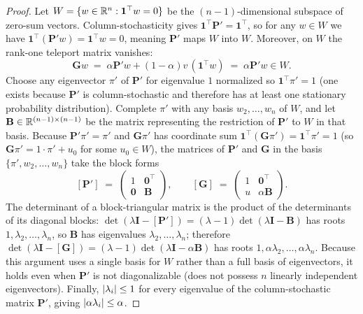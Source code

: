 \begin{proof}
Let $W=\{w \in \mathbb{R}^n : \mathbf{1}^\top w=0\}$ be the $(n-1)$-dimensional subspace of zero-sum vectors. Column-stochasticity gives $\mathbf{1}^\top\mathbf{P}'=\mathbf{1}^\top$, so for any $w \in W$ we have $\mathbf{1}^\top(\mathbf{P}'w) = \mathbf{1}^\top w = 0$, meaning $\mathbf{P}'$ maps $W$ into $W$. Moreover, on $W$ the rank-one teleport matrix vanishes:
\[
  \mathbf{G}w \;=\; \alpha\mathbf{P}'w + (1-\alpha)v\,(\mathbf{1}^\top w) \;=\; \alpha\mathbf{P}'w \in W.
\]
Choose any eigenvector $\pi'$ of $\mathbf{P}'$ for eigenvalue $1$ normalized so $\mathbf{1}^\top \pi' = 1$ (one exists because $\mathbf{P}'$ is column-stochastic and therefore has at least one stationary probability distribution). Complete $\pi'$ with any basis $w_2,\dots,w_n$ of $W$, and let $\mathbf{B} \in \mathbb{R}^{(n-1)\times(n-1)}$ be the matrix representing the restriction of $\mathbf{P}'$ to $W$ in that basis. Because $\mathbf{P}'\pi' = \pi'$ and $\mathbf{G}\pi'$ has coordinate sum $\mathbf{1}^\top(\mathbf{G}\pi') = \mathbf{1}^\top \pi' = 1$ (so $\mathbf{G}\pi' = 1\cdot\pi' + u_0$ for some $u_0 \in W$), the matrices of $\mathbf{P}'$ and $\mathbf{G}$ in the basis $\{\pi', w_2, \dots, w_n\}$ take the block forms
\[
  [\mathbf{P}'] \;=\;
  \begin{pmatrix}
    1 & \mathbf{0}^\top \\
    \mathbf{0} & \mathbf{B}
  \end{pmatrix},
  \qquad
  [\mathbf{G}] \;=\;
  \begin{pmatrix}
    1 & \mathbf{0}^\top \\
    u & \alpha\mathbf{B}
  \end{pmatrix}.
\]
The determinant of a block-triangular matrix is the product of the determinants of its diagonal blocks: $\det(\lambda\mathbf{I} - [\mathbf{P}']) = (\lambda - 1)\det(\lambda\mathbf{I} - \mathbf{B})$ has roots $1, \lambda_2, \dots, \lambda_n$, so $\mathbf{B}$ has eigenvalues $\lambda_2,\dots,\lambda_n$; therefore $\det(\lambda\mathbf{I} - [\mathbf{G}]) = (\lambda - 1)\det(\lambda\mathbf{I} - \alpha\mathbf{B})$ has roots $1, \alpha\lambda_2, \dots, \alpha\lambda_n$. Because this argument uses a single basis for $W$ rather than a full basis of eigenvectors, it holds even when $\mathbf{P}'$ is not diagonalizable (does not possess $n$ linearly independent eigenvectors). Finally, $\lvert\lambda_i\rvert \le 1$ for every eigenvalue of the column-stochastic matrix $\mathbf{P}'$, giving $\lvert\alpha\lambda_i\rvert \le \alpha$.
\end{proof}

